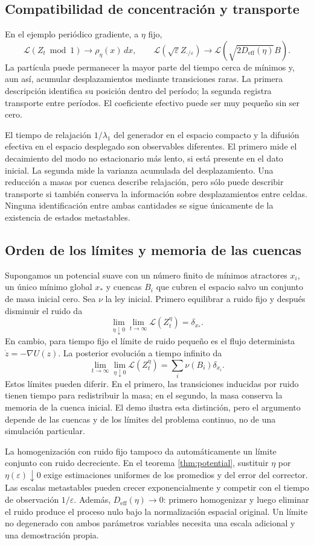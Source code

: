 \documentclass[11pt,a4paper]{article}
\theoremstyle{remark}\newtheorem{remark}{Observación}
\newcommand{\Law}{\mathcal L}
\newcommand{\Deff}{D_{\mathrm{eff}}}
\begin{document}
\subsection{Compatibilidad de concentración y transporte}
En el ejemplo periódico gradiente, a $\eta$ fijo,
\[
 \Law(Z_t\bmod1)\longrightarrow\rho_\eta(x)\,dx,
 \qquad
 \Law(\sqrt\varepsilon Z_{\cdot/\varepsilon})
 \longrightarrow\Law(\sqrt{2\Deff(\eta)}B).
\]
La partícula puede permanecer la mayor parte del tiempo cerca de mínimos y, aun así, acumular desplazamientos mediante transiciones raras. La primera descripción identifica su posición dentro del período; la segunda registra transporte entre períodos. El coeficiente efectivo puede ser muy pequeño sin ser cero.

El tiempo de relajación $1/\lambda_1$ del generador en el espacio compacto y la difusión efectiva en el espacio desplegado son observables diferentes. El primero mide el decaimiento del modo no estacionario más lento, si está presente en el dato inicial. La segunda mide la varianza acumulada del desplazamiento. Una reducción a masas por cuenca describe relajación, pero sólo puede describir transporte si también conserva la información sobre desplazamientos entre celdas. Ninguna identificación entre ambas cantidades se sigue únicamente de la existencia de estados metastables.

\subsection{Orden de los límites y memoria de las cuencas}
Supongamos un potencial suave con un número finito de mínimos atractores $x_i$, un único mínimo global $x_*$ y cuencas $B_i$ que cubren el espacio salvo un conjunto de masa inicial cero. Sea $\nu$ la ley inicial. Primero equilibrar a ruido fijo y después disminuir el ruido da
\[
 \lim_{\eta\downarrow0}\lim_{t\to\infty}\Law(Z_t^\eta)
 =\delta_{x_*}.
\]
En cambio, para tiempo fijo el límite de ruido pequeño es el flujo determinista $\dot z=-\nabla U(z)$. La posterior evolución a tiempo infinito da
\[
 \lim_{t\to\infty}\lim_{\eta\downarrow0}\Law(Z_t^\eta)
 =\sum_i\nu(B_i)\delta_{x_i}.
\]
Estos límites pueden diferir. En el primero, las transiciones inducidas por ruido tienen tiempo para redistribuir la masa; en el segundo, la masa conserva la memoria de la cuenca inicial. El demo ilustra esta distinción, pero el argumento depende de las cuencas y de los límites del problema continuo, no de una simulación particular.

La homogenización con ruido fijo tampoco da automáticamente un límite conjunto con ruido decreciente. En el teorema \ref{thm:potential}, sustituir $\eta$ por $\eta(\varepsilon)\downarrow0$ exige estimaciones uniformes de los promedios y del error del corrector. Las escalas metastables pueden crecer exponencialmente y competir con el tiempo de observación $1/\varepsilon$. Además, $\Deff(\eta)\to0$: primero homogenizar y luego eliminar el ruido produce el proceso nulo bajo la normalización espacial original. Un límite no degenerado con ambos parámetros variables necesita una escala adicional y una demostración propia.
\end{document}
